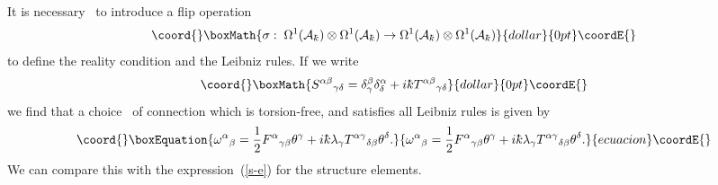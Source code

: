 \documentclass[12pt,a4paper]{article}
\newcounter{eg}
\def\c#1{{\cal #1}}
\def\kbar{{\mathchar'26\mkern-9muk}}
\def\cn#1{\cite{#1}}
\begin{document}
It is necessary~\cite{DubMadMasMou96b} to introduce a flip operation
$$\coord{}\boxMath{
\sigma:\;\Omega^1(\c{A}_\kbar) \otimes \Omega^1(\c{A}_\kbar) \rightarrow
\Omega^1(\c{A}_\kbar) \otimes \Omega^1(\c{A}_\kbar)
}{dollar}{0pt}\coordE{}$$
to define the reality condition and the Leibniz rules.  If we write
$$\coord{}\boxMath{
S^{\alpha\beta}{}_{\gamma\delta} = \delta^\beta_\gamma \delta^\alpha_\delta
+ i\kbar T^{\alpha\beta}{}_{\gamma\delta}
}{dollar}{0pt}\coordE{}$$
we find that a choice~\cn{DimMad96} of connection which is
torsion-free, and satisfies all Leibniz rules is given by
\begin{equation}\coord{}\boxEquation{
\omega^\alpha{}_{\beta} = \frac 12 F^\alpha{}_{\gamma\beta} \theta^\gamma
+ i\kbar \lambda_\gamma T^{\alpha\gamma}{}_{\delta\beta}\theta^\delta.
                                                               \label{t-free}
}{
\omega^\alpha{}_{\beta} = \frac 12 F^\alpha{}_{\gamma\beta} \theta^\gamma
+ i\kbar \lambda_\gamma T^{\alpha\gamma}{}_{\delta\beta}\theta^\delta.
                                                               }{ecuacion}\coordE{}\end{equation}
We can compare this with the expression~(\ref{s-e}) for the structure
elements.  
\end{document}
